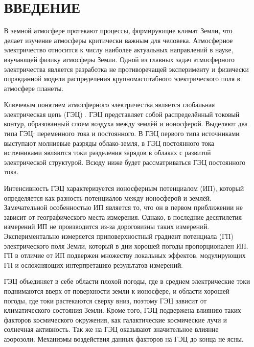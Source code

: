 \section*{ВВЕДЕНИЕ}

В земной атмосфере протекают процессы, формирующие климат Земли, что делает изучение атмосферы критически важным для человека. Атмосферное электричество относится к числу наиболее актуальных направлений в науке, изучающей физику атмосферы Земли. Одной из главных задач атмосферного электричества является разработка не противоречащей эксперименту и физически оправданной модели распределения крупномасштабного электрического поля в атмосфере планеты.

Ключевым понятием атмосферного электричества является глобальная электрическая цепь (ГЭЦ) \cite{Williams_Mareev_2014}. ГЭЦ представляет собой распределённый токовый контур, образованный слоем воздуха между землёй и ионосферой. Выделяют два типа ГЭЦ: переменного тока и постоянного. В ГЭЦ первого типа источниками выступают молниевые разряды облако-земля, в ГЭЦ постоянного тока источниками являются токи разделения зарядов в облаках с развитой электрической структурой. Всюду ниже будет рассматриваться ГЭЦ постоянного тока.

Интенсивность ГЭЦ характеризуется ионосферным потенциалом (ИП), который определяется как разность потенциалов между ионосферой и землёй. Замечательной особенностью ИП является то, что он в первом приближении не зависит от географического места измерения. Однако, в последние десятилетия измерений ИП не производится из-за дороговизны таких измерений. Экспериментально измеряется приповерхностный градиент потенциала (ГП) электрического поля Земли, который в дни хорошей погоды пропорционален ИП. ГП в отличие от ИП подвержен множеству локальных эффектов, модулирующих ГП и осложняющих интерпретацию результатов измерений.

ГЭЦ объединяет в себе области плохой погоды, где в среднем электрические токи поднимаются вверх от поверхности земли к ионосфере, и области хорошей погоды, где токи растекаются сверху вниз, поэтому ГЭЦ зависит от климатического состояния Земли. Кроме того, ГЭЦ подвержена влиянию таких факторов космического окружения, как галактические космические лучи и солнечная активность. Так же на ГЭЦ оказывают значительное влияние аэорозоли. Механизмы воздействия данных факторов на ГЭЦ до конца не ясны.%

